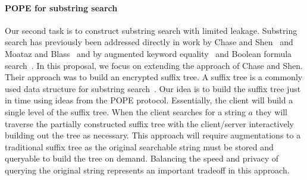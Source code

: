\paragraph{POPE for substring search}
Our second task is to construct substring search with limited leakage.  Substring search has previously been addressed directly in work by Chase and Shen~\cite{chase2015substring} and Moataz and Blass~\cite{EPRINT:MoaBla15} and by augmented keyword equality~\cite{RSA:IKLO16} and Boolean formula search~\cite{CCS:JJKRS13}.  In this proposal, we focus on extending the approach of Chase and Shen.  Their approach was to build an encrypted suffix tree.  A suffix tree is a commonly used data structure for substring search~\cite{mccreight1976space}.  Our idea is to build the suffix tree just in time using ideas from the POPE protocol.  Essentially, the client will build a single level of the suffix tree.  When the client searches for a string $a$ they will traverse the partially constructed suffix tree with the client/server interactively building out the tree as necessary.  This approach will require augmentations to a traditional suffix tree as the original searchable string must be stored and queryable to build the tree on demand.  Balancing the speed and privacy of querying the original string represents an important tradeoff in this approach.